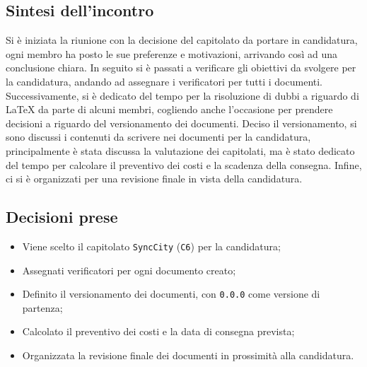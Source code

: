 \subsection{Sintesi dell'incontro}
Si è iniziata la riunione con la decisione del capitolato da portare in candidatura, ogni membro ha posto le sue preferenze e motivazioni, arrivando così ad una conclusione chiara. In seguito si è passati a verificare gli obiettivi da svolgere per la candidatura, andando ad assegnare i verificatori per tutti i documenti. Successivamente, si è dedicato del tempo per la risoluzione di dubbi a riguardo di \LaTeX\: da parte di alcuni membri, cogliendo anche l'occasione per prendere decisioni a riguardo del versionamento dei documenti. Deciso il versionamento, si sono discussi i contenuti da scrivere nei documenti per la candidatura, principalmente è stata discussa la valutazione dei capitolati, ma è stato dedicato del tempo per calcolare il preventivo dei costi e la scadenza della consegna. Infine, ci si è organizzati per una revisione finale in vista della candidatura.
\subsection{Decisioni prese}
\begin{itemize}
	\setlength\itemsep{0em}
	\item Viene scelto il capitolato \texttt{SyncCity} (\texttt{C6}) per la candidatura;
	\item Assegnati verificatori per ogni documento creato;
	\item Definito il versionamento dei documenti, con \texttt{0.0.0} come versione di partenza;
	\item Calcolato il preventivo dei costi e la data di consegna prevista;
	\item Organizzata la revisione finale dei documenti in prossimità alla candidatura.
	\\\\
\end{itemize}
